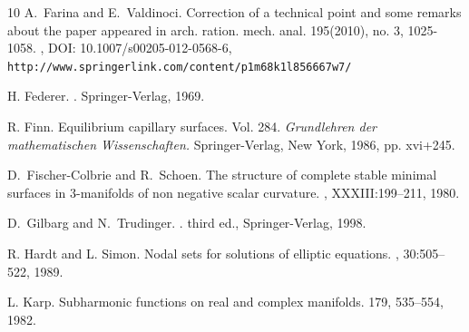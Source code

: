\documentclass[10 pt,a4paper]{article}
\theoremstyle{definition}
\begin{document}
\begin{thebibliography}{10}
A.~Farina and E.~Valdinoci.
\newblock Correction of a technical point and some remarks about the paper appeared in arch. ration. mech. anal. 195(2010), no. 3, 1025-1058.
,
DOI: 10.1007/s00205-012-0568-6,
{\tt http://www.springerlink.com/content/p1m68k1l856667w7/}

H. Federer.
.
\newblock Springer-Verlag, 1969.

 R. Finn. Equilibrium capillary surfaces. Vol. 284. \emph{Grundlehren der mathematischen Wissenschaften.} Springer-Verlag, New York, 1986, pp. xvi+245.


D.~Fischer-Colbrie and R.~Schoen.
\newblock The structure of complete stable minimal surfaces in $3$-manifolds of
  non negative scalar curvature.
, XXXIII:199--211, 1980.

D.~Gilbarg and N.~Trudinger.
.
\newblock third ed., Springer-Verlag, 1998.





R. Hardt and L. Simon.
\newblock Nodal sets for solutions of elliptic equations.
, 30:505--522, 1989.



L. Karp. 
\newblock 
Subharmonic functions on real and complex manifolds. 
 179, 535--554, 1982.


\end{thebibliography}
\end{document}
